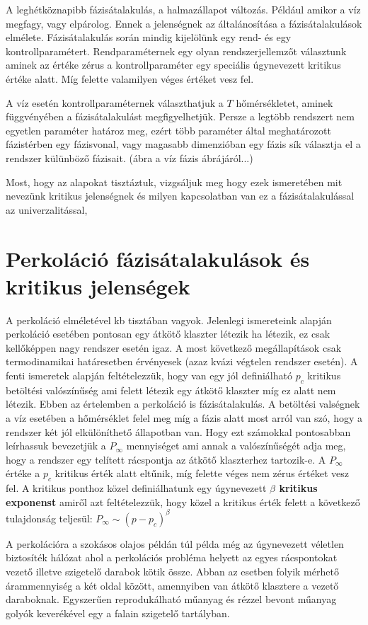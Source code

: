 A leghétköznapibb fázisátalakulás, a halmazállapot változás. Például amikor a víz megfagy, vagy elpárolog. Ennek a jelenségnek az általánosítása a fázisátalakulások elmélete.
Fázisátalakulás során mindig kijelölünk egy rend- és egy kontrollparamétert. Rendparaméternek egy olyan rendszerjellemzőt választunk aminek az értéke zérus a kontrollparaméter egy speciális úgynevezett kritikus értéke alatt. Míg felette valamilyen véges értéket vesz fel.

A víz esetén kontrollparaméternek választhatjuk a $T$ hőmérsékletet, aminek függvényében a fázisátalakulást megfigyelhetjük. Persze a legtöbb rendszert nem egyetlen paraméter határoz meg, ezért több paraméter által meghatározott fázistérben egy fázisvonal, vagy magasabb dimenzióban egy fázis sík választja el a rendszer külünböző fázisait. (ábra a víz fázis ábrájáról...)


Most, hogy az alapokat tisztáztuk, vizgsáljuk meg hogy ezek ismeretében mit nevezünk kritikus jelenségnek és milyen kapcsolatban van ez a fázisátalakulással az univerzalitással,  

\section{Perkoláció fázisátalakulások és kritikus jelenségek}
A perkoláció elméletével kb tisztában vagyok. Jelenlegi ismereteink alapján perkoláció esetében pontosan egy átkötő klaszter létezik ha létezik, ez csak kellőképpen nagy rendszer esetén igaz. A most következő megállapítások csak termodinamikai határesetben érvényesek (azaz kvázi végtelen rendszer esetén). A fenti ismeretek alapján feltételezzük, hogy van egy jól definiálható $p_c$ kritikus betöltési valószínűség ami felett létezik egy átkötő klaszter míg ez alatt nem létezik. Ebben az értelemben a perkoláció is fázisátalakulás. A betöltési valségnek a víz esetében a hőmérséklet felel meg míg a fázis alatt most arról van szó, hogy a rendszer két jól elkülöníthető állapotban van.
Hogy ezt számokkal pontosabban leírhassuk bevezetjük a $P_{\infty}$ mennyiséget ami annak a valószínűségét adja meg, hogy a rendszer egy telített rácspontja az átkötő klaszterhez tartozik-e. A $P_{\infty}$ értéke a $p_c$ kritikus érték alatt eltűnik, míg felette véges nem zérus értéket vesz fel. 
A kritikus ponthoz közel definiálhatunk egy úgynevezett {\bf $\beta$ kritikus exponenst} amiről azt feltételezzük, hogy közel a kritikus érték felett a következő tulajdonság teljesül: $P_{\infty} \sim (p-p_c)^{\beta}$

A perkolációra a szokásos olajos példán túl példa még az úgynevezett véletlen biztosíték hálózat ahol a perkolációs probléma helyett az egyes rácspontokat vezető illetve szigetelő darabok kötik össze. Abban az esetben folyik mérhető árammennyiség a két oldal között, amennyiben van átkötő klasztere a vezető daraboknak. Egyszerűen reprodukálható műanyag és rézzel bevont műanyag golyók keverékével egy a falain szigetelő tartályban.

